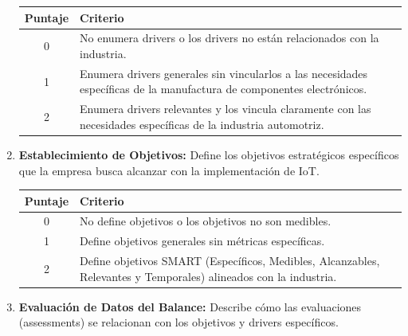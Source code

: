 \documentclass{article}
\begin{document}
\begin{enumerate}
    \begin{table}[h!]
    \centering
    \begin{tabular}{|c|p{10cm}|}
    \hline
    \textbf{Puntaje} & \textbf{Criterio} \\ \hline
    0 & No enumera drivers o los drivers no están relacionados con la industria. \\ \hline
    1 & Enumera drivers generales sin vincularlos a las necesidades específicas de la manufactura de componentes electrónicos. \\ \hline
    2 & Enumera drivers relevantes y los vincula claramente con las necesidades específicas de la industria automotriz. \\ \hline
    \end{tabular}
    \end{table}

    \item \textbf{Establecimiento de Objetivos:}
    Define los objetivos estratégicos específicos que la empresa busca alcanzar con la implementación de IoT.
    
    
    \begin{table}[h!]
    \centering
    \begin{tabular}{|c|p{10cm}|}
    \hline
    \textbf{Puntaje} & \textbf{Criterio} \\ \hline
    0 & No define objetivos o los objetivos no son medibles. \\ \hline
    1 & Define objetivos generales sin métricas específicas. \\ \hline
    2 & Define objetivos SMART (Específicos, Medibles, Alcanzables, Relevantes y Temporales) alineados con la industria. \\ \hline
    \end{tabular}
    \end{table}

    \item \textbf{Evaluación de Datos del Balance:}
    Describe cómo las evaluaciones (assessments) se relacionan con los objetivos y drivers específicos.
    

\end{enumerate}
\end{document}
